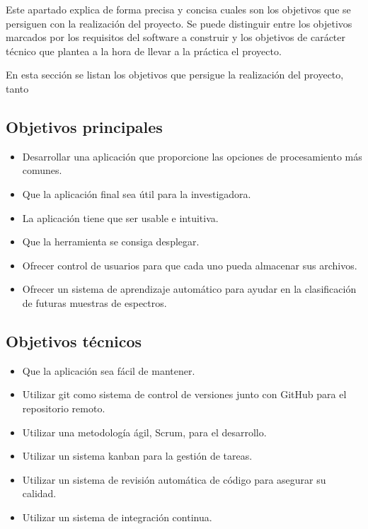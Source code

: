 
Este apartado explica de forma precisa y concisa cuales son los objetivos que se
persiguen con la realización del proyecto. Se puede distinguir entre los
objetivos marcados por los requisitos del software a construir y los objetivos
de carácter técnico que plantea a la hora de llevar a la práctica el proyecto.

En esta sección se listan los objetivos que persigue la realización del
proyecto, tanto 

\subsection{Objetivos principales}
\begin{itemize}
	\tightlist
	\item Desarrollar una aplicación que proporcione las opciones de procesamiento
	más comunes.
	\item Que la aplicación final sea útil para la investigadora.
	\item La aplicación tiene que ser usable e intuitiva.
	\item Que la herramienta se consiga desplegar.
	\item Ofrecer control de usuarios para que cada uno pueda almacenar sus
	archivos.
	\item Ofrecer un sistema de aprendizaje automático para ayudar en la
	clasificación de futuras muestras de espectros.
\end{itemize}

\subsection{Objetivos técnicos}
\begin{itemize}
	\tightlist
	\item Que la aplicación sea fácil de mantener.
	\item Utilizar git como sistema de control de versiones junto con GitHub para
	el repositorio remoto.
	\item Utilizar una metodología ágil, Scrum, para el desarrollo.
	\item Utilizar un sistema kanban para la gestión de tareas.
	\item Utilizar un sistema de revisión automática de código para asegurar su
	calidad.
	\item Utilizar un sistema de integración continua.
\end{itemize}

